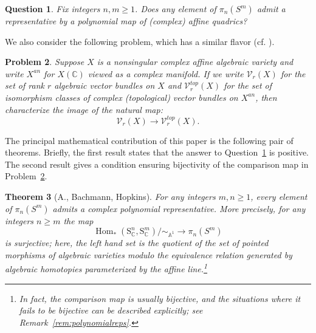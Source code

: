 \documentclass[11pt,leqno]{article}
\renewcommand{\hom}{\operatorname{Hom}}
\newcommand{\cplx}{{\mathbb C}}
\newcommand{\aone}{{\mathbb A}^1}
\renewcommand{\1}{{\rm 1\hspace*{-0.4ex}%
\rule{0.1ex}{1.52ex}\hspace*{0.2ex}}}
\newcommand{\<}[1]{{\langle}#1 {\rangle}}
\newcounter{intro}
\theoremstyle{plain}
\newtheorem{thmintro}{Theorem}
\newtheorem{problemintro}[thmintro]{Problem}
\newtheorem{questionintro}[thmintro]{Question}
\theoremstyle{definition}
\theoremstyle{remark}
\numberwithin{equation}{subsection}
\begin{document}
\begin{questionintro}
	\label{questionintro:polynomialrep}
	Fix integers $n, m \geq 1$.  Does any element of $\pi_n(S^m)$ admit a representative by a polynomial map of (complex) affine quadrics?  
\end{questionintro}

We also consider the following problem, which has a similar flavor (cf. \cite[Question 3.20]{AsokFasel2022VectorBundles}).

\begin{problemintro}
	\label{problemintro:algebraizability}
Suppose $X$ is a nonsingular complex affine algebraic variety and write $X^{an}$ for $X(\cplx)$ viewed as a complex manifold.  If we write $\mathscr{V}_r(X)$ for the set of rank $r$ algebraic vector bundles on $X$ and $\mathscr{V}_r^{top}(X)$ for the set of isomorphism classes of complex (topological) vector bundles on $X^{an}$, then characterize the image of the natural map:
\[
\mathscr{V}_r(X) \longrightarrow \mathscr{V}_r^{top}(X).
\]    
\end{problemintro}

The principal mathematical contribution of this paper is the following pair of theorems.  Briefly, the first result states that the answer to Question~\ref{questionintro:polynomialrep} is positive.  The second result gives a condition ensuring bijectivity of the comparison map in Problem~\ref{problemintro:algebraizability}.

\begin{thmintro}[A., Bachmann, Hopkins]
	\label{thmintro:polynomialrep}
	For any integers $m,n \geq 1$, every element of $\pi_n(S^m)$ admits a complex polynomial representative.  More precisely, for any integers $n \geq m$ the map
	\[
	\hom_*(\mathrm{S}^{n}_{\cplx},\mathrm{S}^{m}_{\cplx})/\sim_{\aone} \longrightarrow \pi_{n}(S^{m})
	\]
	is surjective; here, the left hand set is the quotient of the set of pointed morphisms of algebraic varieties modulo the equivalence relation generated by algebraic homotopies parameterized by the affine line.\footnote{In fact, the comparison map is usually bijective, and the situations where it fails to be bijective can be described explicitly; see Remark~\ref{rem:polynomialreps}.}  
\end{thmintro}


\end{document}
